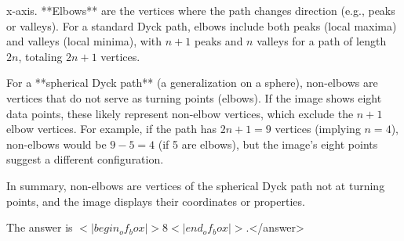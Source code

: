 x-axis. **Elbows** are the vertices where the path changes direction (e.g., peaks or valleys). For a standard Dyck path, elbows include both peaks (local maxima) and valleys (local minima), with \(n+1\) peaks and \(n\) valleys for a path of length \(2n\), totaling \(2n+1\) vertices.  

For a **spherical Dyck path** (a generalization on a sphere), non-elbows are vertices that do not serve as turning points (elbows). If the image shows eight data points, these likely represent non-elbow vertices, which exclude the \(n+1\) elbow vertices. For example, if the path has \(2n+1 = 9\) vertices (implying \(n=4\)), non-elbows would be \(9 - 5 = 4\) (if 5 are elbows), but the image’s eight points suggest a different configuration.  

In summary, non-elbows are vertices of the spherical Dyck path not at turning points, and the image displays their coordinates or properties.  

The answer is \(<|begin_of_box|>8<|end_of_box|>\).</answer>